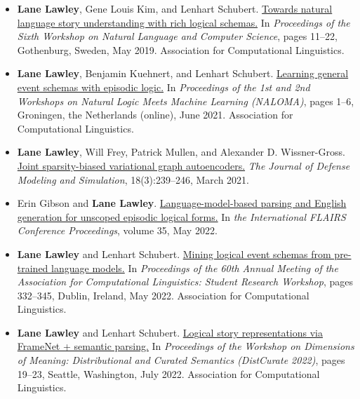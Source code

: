\begin{curriculumvitae}
\begin{itemize}
    \item \textbf{Lane Lawley}, Gene Louis Kim, and Lenhart Schubert. \href{https://aclanthology.org/W19-1102/}{Towards natural language story understanding with rich logical schemas.} In \textit{Proceedings of the Sixth Workshop on Natural Language and Computer Science}, pages 11–22, Gothenburg, Sweden, May 2019. Association for Computational Linguistics.
    \item \textbf{Lane Lawley}, Benjamin Kuehnert, and Lenhart Schubert. \href{https://aclanthology.org/2021.naloma-1.1}{Learning general event schemas with episodic logic.} In \textit{Proceedings of the 1st and 2nd Workshops on Natural Logic Meets Machine Learning (NALOMA)}, pages 1–6, Groningen, the Netherlands (online), June 2021. Association for Computational Linguistics.
    \item \textbf{Lane Lawley}, Will Frey, Patrick Mullen, and Alexander D. Wissner-Gross. \href{https://doi.org/10.1177/1548512921996828}{Joint sparsity-biased variational graph autoencoders.} \textit{The Journal of Defense Modeling and Simulation}, 18(3):239–246, March 2021.
    \item Erin Gibson and \textbf{Lane Lawley}. \href{https://doi.org/10.32473/flairs.v35i.130703}{Language-model-based parsing and English generation for unscoped episodic logical forms.} In \textit{the International FLAIRS Conference Proceedings}, volume 35, May 2022.
    \item \textbf{Lane Lawley} and Lenhart Schubert. \href{https://aclanthology.org/2022.acl-srw.25}{Mining logical event schemas from pre-trained language models.} In \textit{Proceedings of the 60th Annual Meeting of the Association for Computational Linguistics: Student Research Workshop}, pages 332–345, Dublin, Ireland, May 2022. Association for Computational Linguistics.
    \item \textbf{Lane Lawley} and Lenhart Schubert. \href{https://aclanthology.org/2022.distcurate-1.3}{Logical story representations via FrameNet + semantic parsing.} In \textit{Proceedings of the Workshop on Dimensions of Meaning: Distributional and Curated Semantics (DistCurate 2022)}, pages 19–23, Seattle, Washington, July 2022. Association for Computational Linguistics.
\end{itemize}

\end{curriculumvitae}